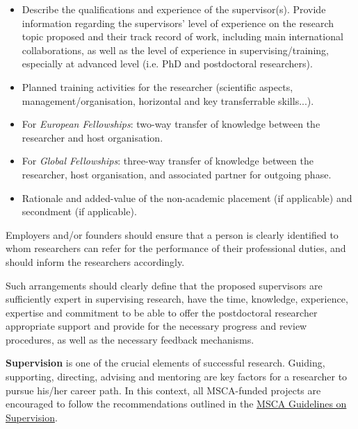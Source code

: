 \documentclass[11pt,draftproposal]{msca-pf}
\begin{document}
\begin{itemize}
    \item Describe the qualifications and experience of the supervisor(s).
    Provide information regarding the supervisors' level of experience on the
    research topic proposed and their track record of work, including main
    international collaborations, as well as the level of experience in
    supervising/training, especially at advanced level (i.e. PhD and postdoctoral
    researchers).

    \item Planned training activities for the researcher (scientific aspects,
    management/organisation, horizontal and key transferrable skills...).

    \item For \emph{European Fellowships}: two-way transfer of knowledge between
    the researcher and host organisation.

    \item For \emph{Global Fellowships}: three-way transfer of knowledge between
    the researcher, host organisation, and associated partner for outgoing phase.

    \item Rationale and added-value of the non-academic placement (if applicable)
    and secondment (if applicable).
\end{itemize}

Employers and/or founders should ensure that a person is clearly identified to
whom researchers can refer for the performance of their professional duties, and
should inform the researchers accordingly.

Such arrangements should clearly define that the proposed supervisors are
sufficiently expert in supervising research, have the time, knowledge, experience,
expertise and commitment to be able to offer the postdoctoral researcher
appropriate support and provide for the necessary progress and review procedures,
as well as the necessary feedback mechanisms.

\textbf{Supervision} is one of the crucial elements of successful research. Guiding,
supporting, directing, advising and mentoring are key factors for a researcher
to pursue his/her career path. In this context, all MSCA-funded projects are
encouraged to follow the recommendations outlined in the
\href{https://data.europa.eu/doi/10.2766/508311}{MSCA Guidelines on Supervision}\footnotemark{}.

\end{document}
